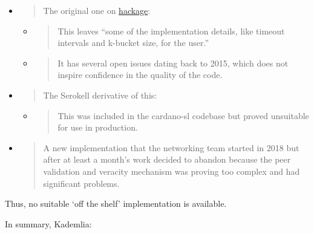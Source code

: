 \documentclass[]{article}
\begin{document}
\begin{itemize}
\item
  \begin{quote}
  The original one on
  \href{https://hackage.haskell.org/package/kademlia-1.1.0.0}{{hackage}}:
  \end{quote}

  \begin{itemize}
  \item
    \begin{quote}
    This leaves ``some of the implementation details, like timeout
    intervals and k-bucket size, for the user.''
    \end{quote}
  \item
    \begin{quote}
    It has several open issues dating back to 2015, which does not
    inspire confidence in the quality of the code.
    \end{quote}
  \end{itemize}
\item
  \begin{quote}
  The Serokell derivative of this:
  \end{quote}

  \begin{itemize}
  \item
    \begin{quote}
    This was included in the cardano-sl codebase but proved unsuitable
    for use in production.
    \end{quote}
  \end{itemize}
\item
  \begin{quote}
  A new implementation that the networking team started in 2018 but
  after at least a month's work decided to abandon because the peer
  validation and veracity mechanism was proving too complex and had
  significant problems.
  \end{quote}
\end{itemize}

Thus, no suitable `off the shelf' implementation is available.

In summary, Kademlia:
\end{document}
